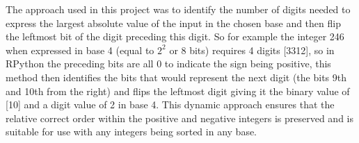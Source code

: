 \documentclass[12pt]{article}
\begin{document}
	\newline
	The approach used in this project was to identify the number of digits needed to express the largest absolute value of the input in the chosen base and then flip the leftmost bit of the digit preceding this digit. So for example the integer 246 when expressed in base 4  (equal to $2^{2}$ or 8 bits) requires 4 digits [3312], so in RPython the preceding bits are all 0 to indicate the sign being positive, this method then identifies the bits that would represent the next digit (the bits 9th and 10th from the right) and flips the leftmost digit giving it the binary value of [10] and a digit value of 2 in base 4. This dynamic approach ensures that the relative correct order within the positive and negative integers is preserved  and is suitable for use with any integers being sorted in any base.


	
	
	
\end{document}
